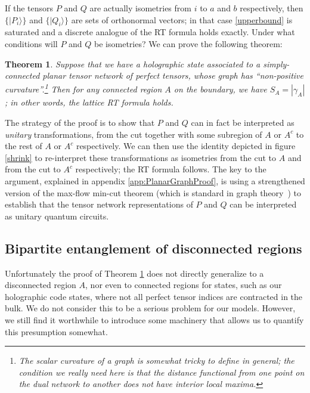 \documentclass[12pt]{article}
\theoremstyle{plain}
\newtheorem{theorem}{Theorem}
\theoremstyle{plain}
\theoremstyle{plain}
\theoremstyle{plain}
\theoremstyle{result}
\theoremstyle{remark}
\theoremstyle{conjecture}
\theoremstyle{observation}
\theoremstyle{definition}
\theoremstyle{corollary}
\theoremstyle{definition}
\theoremstyle{definition}
\theoremstyle{assumption}
\theoremstyle{definition}
\theoremstyle{problem}
\theoremstyle{fact}
\begin{document}
If the tensors $P$ and $Q$ are actually isometries from $i$ to $a$ and $b$ respectively, then $\{|P_i\rangle\}$ and $\{|Q_i\rangle\}$ are sets of orthonormal vectors; in that case  \eqref{upperbound} is saturated and a discrete analogue of the RT formula holds exactly. Under what conditions will $P$ and $Q$ be isometries? We can prove the following theorem:
\begin{theorem}\label{RTth}
Suppose that we have a holographic state associated to a simply-connected planar tensor network of perfect tensors, whose graph has ``non-positive curvature''.\footnote{The scalar curvature of a graph is somewhat tricky to define in general; the condition we really need here is that the distance functional from one point on the dual network to another does not have interior local maxima. %
}   Then for any connected region $A$ on the boundary, we have $S_A=|\gamma_A|$; in other words, the lattice RT formula holds.
\end{theorem}
The strategy of the proof is to show that $P$ and $Q$ can in fact be interpreted as \textit{unitary} transformations, from the cut together with some subregion of $A$ or $A^c$ to the rest of $A$ or $A^c$ respectively.  
We can then use the identity depicted in figure \ref{shrink} to re-interpret these transformations as isometries from the cut to $A$ and from the cut to $A^c$ respectively; the RT formula follows.  
The key to the argument, explained in appendix  \ref{app:PlanarGraphProof}, is using a strengthened version of the max-flow min-cut theorem (which is standard in graph theory~\cite{Papadimitriou1998}) to establish that the tensor network representations of $P$ and $Q$ can be interpreted as unitary quantum circuits.  

\subsection{Bipartite entanglement of disconnected regions}\label{subsec:multiple-regions}
Unfortunately the proof of Theorem \ref{RTth} does not directly generalize to a disconnected region $A$, nor even to connected regions for states, such as our holographic code states, where not all perfect tensor indices are contracted in the bulk.  We do not consider this to be a serious problem for our models. 
However, we still find it worthwhile to introduce some machinery that allows us to quantify this presumption somewhat. %
\end{document}
